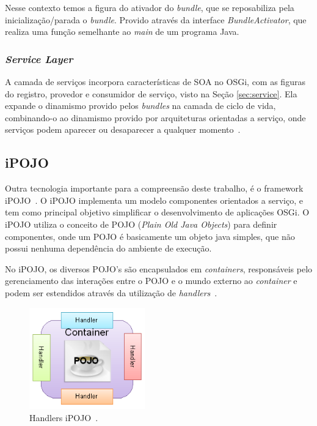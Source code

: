 Nesse contexto temos a figura do ativador do \textit{bundle}, que se reposabiliza pela inicialização/parada o \textit{bundle}. Provido através da interface \textit{BundleActivator}, que realiza uma função semelhante ao \textit{main} de um programa Java.

\subsubsection{\textit{Service Layer}}
A camada de serviços incorpora características de SOA no OSGi, com as figuras do registro, provedor e consumidor de serviço, visto na Seção \ref{sec:service}. Ela expande o dinamismo provido pelos \textit{bundles} na camada de ciclo de vida, combinando-o ao dinamismo provido por arquiteturas orientadas a serviço, onde serviços podem aparecer ou desaparecer a qualquer momento~\cite{hall2010osgi}.

\subsection{iPOJO}
\label{subsec:ipojo}
Outra tecnologia importante para a compreensão deste trabalho, é o framework iPOJO~\cite{ipojo}. O iPOJO implementa um modelo componentes orientados a serviço, e tem como principal objetivo simplificar o desenvolvimento de aplicações OSGi. O iPOJO utiliza o conceito de POJO (\textit{Plain Old Java Objects}) para definir componentes, onde um POJO é basicamente um objeto java simples, que não possui nenhuma dependência do ambiente de execução.
	
No iPOJO, os diversos POJO's são encapsulados em \textit{containers}, responsáveis pelo gerenciamento das interações entre o POJO e o mundo externo ao \textit{container} e podem ser estendidos através da utilização de \textit{handlers}~\cite{ipojo}.

\begin{figure}[htp]
\centering
\includegraphics[width=5cm]{chapters/chapter2/ipojo-handlers.png}
\caption[Handlers Ipojo]{Handlers iPOJO~\cite{ipojo}.}
\label{fig:arch_osgi}
\end{figure}

